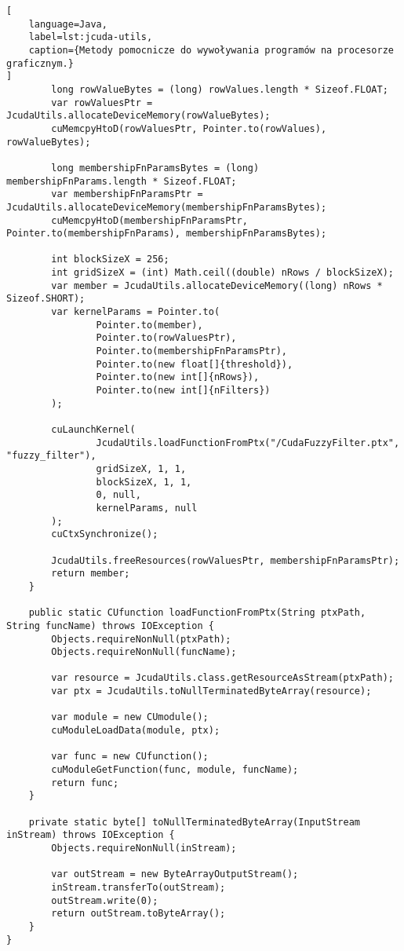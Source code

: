 \begin{lstlisting}[
    language=Java,
    label=lst:jcuda-utils,
    caption={Metody pomocnicze do wywoływania programów na procesorze graficznym.}
]
        long rowValueBytes = (long) rowValues.length * Sizeof.FLOAT;
        var rowValuesPtr = JcudaUtils.allocateDeviceMemory(rowValueBytes);
        cuMemcpyHtoD(rowValuesPtr, Pointer.to(rowValues), rowValueBytes);

        long membershipFnParamsBytes = (long) membershipFnParams.length * Sizeof.FLOAT;
        var membershipFnParamsPtr = JcudaUtils.allocateDeviceMemory(membershipFnParamsBytes);
        cuMemcpyHtoD(membershipFnParamsPtr, Pointer.to(membershipFnParams), membershipFnParamsBytes);

        int blockSizeX = 256;
        int gridSizeX = (int) Math.ceil((double) nRows / blockSizeX);
        var member = JcudaUtils.allocateDeviceMemory((long) nRows * Sizeof.SHORT);
        var kernelParams = Pointer.to(
                Pointer.to(member),
                Pointer.to(rowValuesPtr),
                Pointer.to(membershipFnParamsPtr),
                Pointer.to(new float[]{threshold}),
                Pointer.to(new int[]{nRows}),
                Pointer.to(new int[]{nFilters})
        );

        cuLaunchKernel(
                JcudaUtils.loadFunctionFromPtx("/CudaFuzzyFilter.ptx", "fuzzy_filter"),
                gridSizeX, 1, 1,
                blockSizeX, 1, 1,
                0, null,
                kernelParams, null
        );
        cuCtxSynchronize();

        JcudaUtils.freeResources(rowValuesPtr, membershipFnParamsPtr);
        return member;
    }

    public static CUfunction loadFunctionFromPtx(String ptxPath, String funcName) throws IOException {
        Objects.requireNonNull(ptxPath);
        Objects.requireNonNull(funcName);

        var resource = JcudaUtils.class.getResourceAsStream(ptxPath);
        var ptx = JcudaUtils.toNullTerminatedByteArray(resource);

        var module = new CUmodule();
        cuModuleLoadData(module, ptx);

        var func = new CUfunction();
        cuModuleGetFunction(func, module, funcName);
        return func;
    }

    private static byte[] toNullTerminatedByteArray(InputStream inStream) throws IOException {
        Objects.requireNonNull(inStream);

        var outStream = new ByteArrayOutputStream();
        inStream.transferTo(outStream);
        outStream.write(0);
        return outStream.toByteArray();
    }
}
\end{lstlisting}
\newpage

